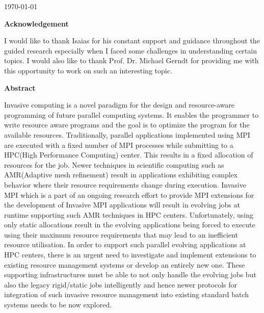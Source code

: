 \documentclass[a4paper, 12pt]{article}
\begin{document}
\begin{titlepage}


{\large \today}\\[2cm] %

\end{titlepage}

\begin{center}
\huge \bfseries Acknowledgement
\end{center}
\thispagestyle{empty}
\vspace{35mm}
I would like to thank  Isaias for his constant support and guidance throughout the guided research especially when I faced some challenges in understanding certain topics. I would also like to thank Prof. Dr. Michael Gerndt for providing me with this opportunity to work on such an interesting topic.

\newpage

\begin{center}
\huge \bfseries Abstract
\end{center}
\thispagestyle{empty}
\vspace{35mm}
\noindent
Invasive computing is a novel paradigm for the design and resource-aware programming of future parallel computing systems. It enables the programmer to write resource aware programs and the goal is to optimize the program for the available resources. Traditionally, parallel applications implemented using MPI are executed with a fixed number of MPI processes while submitting to a HPC(High Performance Computing) center. This results in a fixed allocation of resources for the job. Newer techniques in scientific computing such as AMR(Adaptive mesh refinement) result in applications exhibiting complex behavior where their resource requirements change during execution. Invasive MPI which is a part of an ongoing research effort to provide MPI extensions for the development of Invasive MPI applications will result in evolving jobs at runtime supporting such AMR techniques in HPC centers. Unfortunately, using only static allocations result in the evolving applications being forced to execute using their maximum resource requirements that may lead to an inefficient resource utilisation. In order to support such parallel evolving applications at HPC centers, there is an urgent need to investigate and implement extensions to existing resource management systems or develop an entirely new one. These supporting infrastructures must be able to not only handle the evolving jobs but also the legacy rigid/static jobs intelligently and hence newer protocols for integration of such invasive resource management into existing standard batch systems needs to be now explored.
\end{document}
